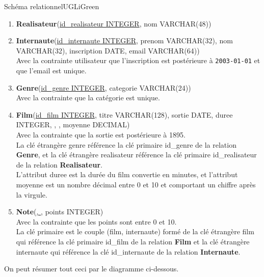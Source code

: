 \documentclass[a4paper,10pt]{article}
\begin{document}
\begin{encadrecolore}{Schéma relationnel}{UGLiGreen}

\begin{enumerate}[\textbullet]
	\item 	\textbf{Realisateur}(\uline{id\_realisateur INTEGER}, nom VARCHAR(48))\\
	\item 	\scriptsize\textbf{Internaute}(\uline{id\_internaute INTEGER}, prenom VARCHAR(32), nom VARCHAR(32), inscription DATE, email VARCHAR(64))\\\normalsize
            Avec la contrainte utilisateur que l'inscription est postérieure à \texttt{2003-01-01} et que l'email est unique.\\
    \item   \textbf{Genre}(\uline{id\_genre INTEGER}, categorie VARCHAR(24))\\
            Avec la contrainte que la catégorie est unique.\\

     \item  \scriptsize\textbf{Film}(\uline{id\_film INTEGER}, titre VARCHAR(128), sortie DATE, duree INTEGER, , , moyenne DECIMAL)\\\normalsize
     Avec la contrainte que la sortie est postérieure à 1895.\\
     La clé étrangère genre référence la clé primaire id\_genre de la relation \textbf{Genre}, et la clé étrangère realisateur référence la clé primaire id\_realisateur de la relation \textbf{Realisateur}.\\
     L'attribut duree est la durée du film convertie en minutes, et l'attribut moyenne est un nombre décimal entre 0 et 10 et comportant un chiffre après la virgule.\\
     \item \textbf{Note}(\uline{, }, points INTEGER)\\
     Avec la contrainte que les points sont entre 0 et 10.\\
     La clé primaire est le couple (film, internaute) formé de la clé étrangère film qui référence la clé primaire id\_film de la relation \textbf{Film} et la clé étrangère internaute qui référence la clé id\_internaute  de la relation \textbf{Internaute}.

\end{enumerate}






\end{encadrecolore}
On peut résumer tout ceci par le diagramme ci-dessous.
\end{document}
